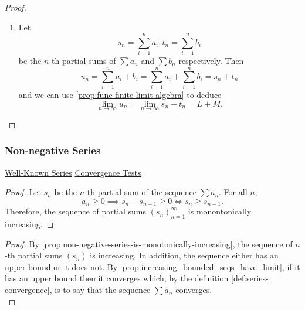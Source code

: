 \documentclass[../MathsNotesBase.tex]{subfiles}
\begin{document}
{\begin{proof}
\begin{enumerate}[label=(\roman*)]
				\bigskip
				\item Let
					\[ s_n = \sum_{i=1}^n a_i, t_n = \sum_{i=1}^n b_i \]
					be the $n$-th partial sums of ${ \sum a_n }$ and ${ \sum b_n }$ respectively.
					Then
					\[ u_n = \sum_{i=1}^n a_i + b_i = \sum_{i=1}^n a_i + \sum_{i=1}^n b_i = s_n + t_n \]
					and we can use \autoref{prop:func-finite-limit-algebra} to deduce
					\[ \lim_{n \to \infty} u_n = \lim_{n \to \infty} s_n + t_n = L + M. \]
			\end{enumerate}
		\end{proof}
	
	
		\biggerskip
		\subsubsection{Non-negative Series}
		{\tiny 
			\hyperref[ssssection:well-known-non-negative-series]{Well-Known Series} \hspace{20pt} \hyperref[ssssection:convergence-tests-for-non-negative-series]{Convergence Tests}
		}
		\biggerskip
		\begin{proof}
			Let $s_n$ be the $n$-th partial sum of the sequence $\sum a_n$. For all $n$, 
			\[ a_n \geq 0 \implies s_n - s_{n-1} \geq 0 \iff s_n \geq s_{n-1}. \]
			Therefore, the sequence of partial sums $(s_n)_{n=1}^\infty$ is monontonically increasing. 
		\end{proof}
				
		\bigskip
		\begin{proof}
			By \autoref{prop:non-negative-series-is-monotonically-increasing}, the sequence of $n$-th partial sums $(s_n)$ is increasing. In addition, the sequence either has an upper bound or it does not. By \autoref{prop:increasing_bounded_seqs_have_limit}, if it has an upper bound then it converges which, by the definition \ref{def:series-convergence}, is to say that the sequence $\sum a_n$ converges.\\
			

\end{proof}}
\end{document}
